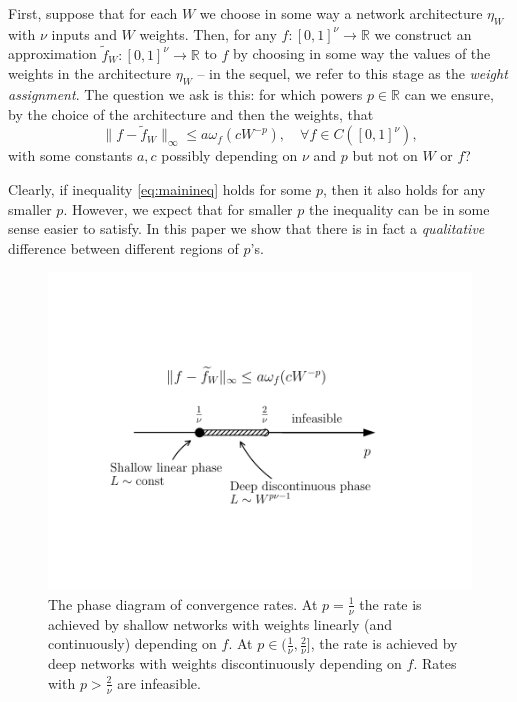 \documentclass[final, 12pt]{colt2018}
\begin{document}
First, suppose that for each $W$ we choose in some way a network architecture $\eta_W$ with $\nu$ inputs and $W$ weights. Then, for any $f:[0,1]^\nu\to\mathbb R$ we construct an approximation $\widetilde f_W:[0,1]^\nu\to \mathbb R$ to $f$ by choosing in some way the values of the weights in the architecture $\eta_W$  -- in the sequel, we refer to this stage as the \emph{weight assignment}. The question we ask is this: for which powers $p\in\mathbb R$ can we ensure, by the choice of the architecture and then the weights, that
\begin{equation}\label{eq:mainineq}
\|f-\widetilde f_W\|_\infty\le a\omega_f(c W^{-p}), \quad \forall f\in C([0,1]^\nu),
\end{equation}
with some constants $a, c$ possibly depending on $\nu$ and $p$ but not on $W$ or $f$?

Clearly, if inequality \eqref{eq:mainineq} holds for some $p$, then it also holds for any smaller $p$. However, we expect that for smaller $p$ the inequality can be in some sense easier to satisfy. In this paper we show that there is in fact a  \emph{qualitative} difference between different regions of $p$'s. 

\begin{figure}
\begin{center}
\includegraphics[clip,trim=20mm 30mm 30mm 35mm, scale=0.8]{phaseDiag_noType3fonts.pdf}
\caption{The phase diagram of convergence rates. At $p=\frac{1}{\nu}$ the rate is achieved by shallow networks with weights linearly (and continuously) depending on $f$. At $p\in(\frac{1}{\nu},\frac{2}{\nu}]$, the rate is achieved by deep networks with weights discontinuously depending on $f$. Rates with $p>\frac{2}{\nu}$ are infeasible.}\label{fig:phasediag}
\end{center}
\end{figure}
\end{document}
